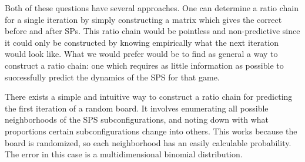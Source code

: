 \documentclass[12pt]{article}
\theoremstyle{definition}
\theoremstyle{remark}
\theoremstyle{remark}
\begin{document}
\par
Both of these questions have several approaches. One can determine a ratio chain for a single iteration by simply constructing a matrix which gives the correct before and after SPs. This ratio chain would be pointless and non-predictive since it could only be constructed by knowing empirically what the next iteration would look like. What we would prefer would be to find as general a way to construct a ratio chain: one which requires as little information as possible to successfully predict the dynamics of the SPS for that game.



\par
There exists a simple and intuitive way to construct a ratio chain for predicting the first iteration of a random board. It involves enumerating all possible neighborhoods of the SPS subconfigurations, and noting down with what proportions certain subconfigurations change into others. This works because the board is randomized, so each neighborhood has an easily calculable probability. The error in this case is a multidimensional binomial distribution. %
\end{document}
